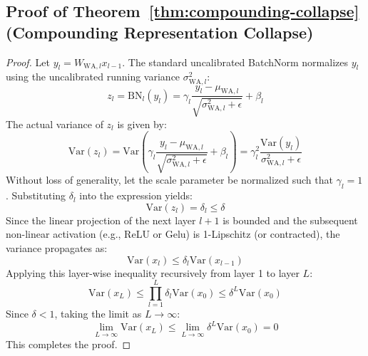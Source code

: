 \documentclass{article}
\theoremstyle{plain}
\theoremstyle{definition}
\theoremstyle{remark}
\begin{document}
\subsection{Proof of Theorem~\ref{thm:compounding-collapse} (Compounding Representation Collapse)}
\label{appendix:compounding-proof}
\begin{proof}
Let $y_l = W_{\text{WA}, l} x_{l-1}$. The standard uncalibrated BatchNorm normalizes $y_l$ using the uncalibrated running variance $\sigma^2_{\text{WA}, l}$:
\begin{equation}
    z_l = \text{BN}_l(y_l) = \gamma_l \frac{y_l - \mu_{\text{WA}, l}}{\sqrt{\sigma^2_{\text{WA}, l} + \epsilon}} + \beta_l
\end{equation}
The actual variance of $z_l$ is given by:
\begin{equation}
    \text{Var}(z_l) = \text{Var}\left(\gamma_l \frac{y_l - \mu_{\text{WA}, l}}{\sqrt{\sigma^2_{\text{WA}, l} + \epsilon}} + \beta_l\right) = \gamma_l^2 \frac{\text{Var}(y_l)}{\sigma^2_{\text{WA}, l} + \epsilon}
\end{equation}
Without loss of generality, let the scale parameter be normalized such that $\gamma_l = 1$. Substituting $\delta_l$ into the expression yields:
\begin{equation}
    \text{Var}(z_l) = \delta_l \le \delta
\end{equation}
Since the linear projection of the next layer $l+1$ is bounded and the subsequent non-linear activation (e.g., ReLU or Gelu) is 1-Lipschitz (or contracted), the variance propagates as:
\begin{equation}
    \text{Var}(x_l) \le \delta_l \text{Var}(x_{l-1})
\end{equation}
Applying this layer-wise inequality recursively from layer 1 to layer $L$:
\begin{equation}
    \text{Var}(x_L) \le \prod_{l=1}^L \delta_l \text{Var}(x_0) \le \delta^L \text{Var}(x_0)
\end{equation}
Since $\delta < 1$, taking the limit as $L \to \infty$:
\begin{equation}
    \lim_{L \to \infty} \text{Var}(x_L) \le \lim_{L \to \infty} \delta^L \text{Var}(x_0) = 0
\end{equation}
This completes the proof.
\end{proof}
\end{document}
